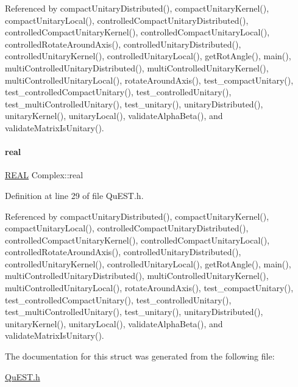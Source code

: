Referenced by compact\+Unitary\+Distributed(), compact\+Unitary\+Kernel(), compact\+Unitary\+Local(), controlled\+Compact\+Unitary\+Distributed(), controlled\+Compact\+Unitary\+Kernel(), controlled\+Compact\+Unitary\+Local(), controlled\+Rotate\+Around\+Axis(), controlled\+Unitary\+Distributed(), controlled\+Unitary\+Kernel(), controlled\+Unitary\+Local(), get\+Rot\+Angle(), main(), multi\+Controlled\+Unitary\+Distributed(), multi\+Controlled\+Unitary\+Kernel(), multi\+Controlled\+Unitary\+Local(), rotate\+Around\+Axis(), test\+\_\+compact\+Unitary(), test\+\_\+controlled\+Compact\+Unitary(), test\+\_\+controlled\+Unitary(), test\+\_\+multi\+Controlled\+Unitary(), test\+\_\+unitary(), unitary\+Distributed(), unitary\+Kernel(), unitary\+Local(), validate\+Alpha\+Beta(), and validate\+Matrix\+Is\+Unitary().

\mbox{\label{structComplex_a479ad939835457595fcca3ca55c06283}} 
\paragraph{\texorpdfstring{real}{real}}
{\footnotesize\ttfamily \mbox{\hyperlink{QuEST__precision_8h_a4b654506f18b8bfd61ad2a29a7e38c25}{R\+E\+AL}} Complex\+::real}



Definition at line 29 of file Qu\+E\+S\+T.\+h.



Referenced by compact\+Unitary\+Distributed(), compact\+Unitary\+Kernel(), compact\+Unitary\+Local(), controlled\+Compact\+Unitary\+Distributed(), controlled\+Compact\+Unitary\+Kernel(), controlled\+Compact\+Unitary\+Local(), controlled\+Rotate\+Around\+Axis(), controlled\+Unitary\+Distributed(), controlled\+Unitary\+Kernel(), controlled\+Unitary\+Local(), get\+Rot\+Angle(), main(), multi\+Controlled\+Unitary\+Distributed(), multi\+Controlled\+Unitary\+Kernel(), multi\+Controlled\+Unitary\+Local(), rotate\+Around\+Axis(), test\+\_\+compact\+Unitary(), test\+\_\+controlled\+Compact\+Unitary(), test\+\_\+controlled\+Unitary(), test\+\_\+multi\+Controlled\+Unitary(), test\+\_\+unitary(), unitary\+Distributed(), unitary\+Kernel(), unitary\+Local(), validate\+Alpha\+Beta(), and validate\+Matrix\+Is\+Unitary().



The documentation for this struct was generated from the following file\+:\begin{DoxyCompactItemize}
\item 
\mbox{\hyperlink{QuEST_8h}{Qu\+E\+S\+T.\+h}}\end{DoxyCompactItemize}

